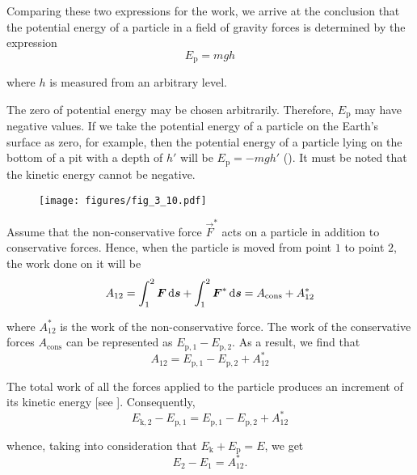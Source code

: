 \noindent
Comparing these two expressions for the work, we arrive at the conclusion that the potential energy of a particle in a field of gravity forces is determined by the expression
\begin{equation}\label{eq:3_36}
E_{\text{p}} = mgh
\end{equation}

\noindent
where $h$ is measured from an arbitrary level.

The zero of potential energy may be chosen arbitrarily. Therefore, $E_{\text{p}}$ may have negative values. If we take the potential energy of a particle on the Earth's surface as zero, for example, then the potential energy of a particle lying on the bottom of a pit with a depth of $h'$ will be $E_{\text{p}}=-mgh'$ (). It must be noted that the kinetic energy cannot be negative.

\begin{figure}[t]
	\begin{center}
		\texttt{[image: figures/fig\_3\_10.pdf]}
		\caption[]{}
		\label{fig:3_10}
	\end{center}
	\vspace{-0.7cm}
\end{figure}

Assume that the non-conservative force $\vec{F}^*$ acts on a particle in addition to conservative forces. Hence, when the particle is moved from point $1$ to point $2$, the work done on it will be
\begin{equation*}
A_{12} = \int_{1}^{2} \boldsymbol{F}\,\mathrm{d}\boldsymbol{s} + \int_{1}^{2} \boldsymbol{F}^*\,\mathrm{d}\boldsymbol{s} = A_{\text{cons}} + A_{12}^*
\end{equation*}

\noindent
where $A_{12}^*$ is the work of the non-conservative force. The work of the conservative forces $A_{\text{cons}}$ can be represented as $E_{\text{p},1}-E_{\text{p},2}$. As a result, we find that
\begin{equation*}
A_{12} = E_{\text{p},1} - E_{\text{p},2} + A_{12}^*
\end{equation*}

\noindent
The total work of all the forces applied to the particle produces an increment of its kinetic energy [see ]. Consequently,
\begin{equation*}
E_{\text{k},2} - E_{\text{p},1} = E_{\text{p},1} - E_{\text{p},2} + A_{12}^*
\end{equation*}

\noindent
whence, taking into consideration that $E_{\text{k}}+E_{\text{p}}=E$, we get
\begin{equation}\label{eq:3_37}
E_2 - E_1 = A_{12}^*.
\end{equation}


